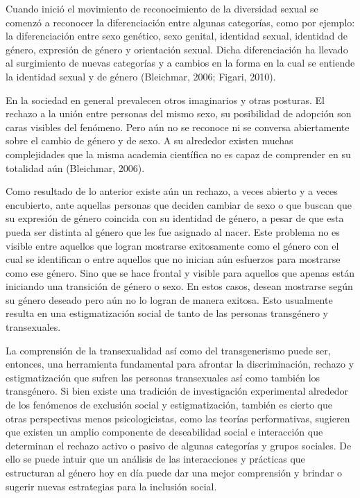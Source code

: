Cuando inició el movimiento de reconocimiento de la diversidad sexual se
comenzó a reconocer la diferenciación entre algunas categorías, como por
ejemplo: la diferenciación entre sexo genético, sexo genital, identidad
sexual, identidad de género, expresión de género y orientación sexual.
Dicha diferenciación ha llevado al surgimiento de nuevas categorías y a
cambios en la forma en la cual se entiende la identidad sexual y de género
(Bleichmar, 2006; Figari, 2010).

En la sociedad en general prevalecen otros imaginarios y otras posturas.
El rechazo a la unión entre personas del mismo sexo, su posibilidad de adopción
son caras visibles del fenómeno.
Pero aún no se reconoce ni se conversa abiertamente sobre el cambio de género y
de sexo.
A su alrededor existen muchas complejidades que la misma academia científica no
es capaz de comprender en su totalidad aún (Bleichmar, 2006).

Como resultado de lo anterior existe aún un rechazo, a veces abierto y a veces
encubierto, ante aquellas personas que deciden cambiar de sexo o que buscan que
su expresión de género coincida con su identidad de género, a pesar de que esta
pueda ser distinta al género que les fue asignado al nacer.
Este problema no es visible entre aquellos que logran mostrarse exitosamente
como el género con el cual se identifican o entre aquellos que no inician aún
esfuerzos para mostrarse como ese género.
Sino que se hace frontal y visible para aquellos que apenas están iniciando una
transición de género o sexo.
En estos casos, desean mostrarse según su género deseado pero aún no lo logran
de manera exitosa.
Esto usualmente resulta en una estigmatización social de tanto de las personas
transgénero y transexuales.

La comprensión de la transexualidad así como del transgenerismo puede ser,
entonces, una herramienta fundamental para afrontar la discriminación, rechazo y
estigmatización que sufren las personas transexuales así como también los
transgénero.
Si bien existe una tradición de investigación experimental alrededor de los
fenómenos de exclusión social y estigmatización, también es cierto que otras
perspectivas menos psicologicistas, como las teorías performativas, sugieren que
existen un amplio componente de deseabilidad social e interacción que determinan
el rechazo activo o pasivo de algunas categorías y grupos sociales.
De ello se puede intuir que un análisis de las interacciones y prácticas que
estructuran al género hoy en día puede dar una mejor comprensión y brindar o
sugerir nuevas estrategias para la inclusión social.

